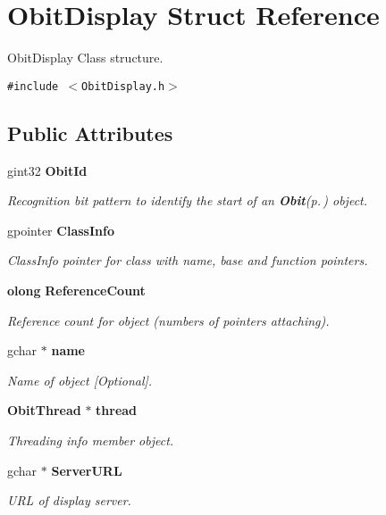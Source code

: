 \section{Obit\-Display Struct Reference}
\label{structObitDisplay}
Obit\-Display Class structure.  


{\tt \#include $<$Obit\-Display.h$>$}

\subsection*{Public Attributes}
\begin{CompactItemize}
\item 
gint32 {\bf Obit\-Id}
\begin{CompactList}\small\item\em Recognition bit pattern to identify the start of an {\bf Obit}{\rm (p.\,\pageref{structObit})} object. \item\end{CompactList}\item 
gpointer {\bf Class\-Info}
\begin{CompactList}\small\item\em Class\-Info pointer for class with name, base and function pointers. \item\end{CompactList}\item 
{\bf olong} {\bf Reference\-Count}
\begin{CompactList}\small\item\em Reference count for object (numbers of pointers attaching). \item\end{CompactList}\item 
gchar $\ast$ {\bf name}
\begin{CompactList}\small\item\em Name of object [Optional]. \item\end{CompactList}\item 
{\bf Obit\-Thread} $\ast$ {\bf thread}
\begin{CompactList}\small\item\em Threading info member object. \item\end{CompactList}\item 
gchar $\ast$ {\bf Server\-URL}
\begin{CompactList}\small\item\em URL of display server. \item\end{CompactList}\item 

\end{CompactItemize}
